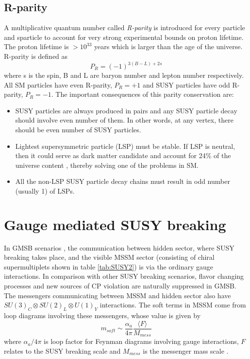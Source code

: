 \subsection{R-parity}
A multiplicative quantum number called \textit{R-parity} is introduced for every particle and sparticle to account for very strong experimental bounds on proton lifetime. The proton lifetime is $>10^{33}$ years \cite{PhysRevLett.102.141801} which is larger than the age of the universe. R-parity is defined as
\begin{equation}
\label{eqn:rparity}
P_R = (-1)^{3(B-L)+2s}
\end{equation}
where s is the spin, B and L are baryon number and lepton number respectively. All SM particles have even R-parity, $P_R=+1$ and SUSY particles have odd R-parity, $P_R=-1$. The important consequences of this parity conservation are:
\begin{itemize}
\item SUSY particles are always produced in pairs and any SUSY particle decay should involve even number of them. In other words, at any vertex, there should be even number of SUSY particles.
\item Lightest supersymmetric particle (LSP) must be stable. If LSP is neutral, then it could serve as dark matter candidate and account for 24\% of the universe content \cite{ELLIS1984453}, thereby solving one of the problems in SM.
\item All the non-LSP SUSY particle decay chains must result in odd number (usually 1) of LSPs.
\end{itemize}

\section{Gauge mediated SUSY breaking}
\label{sec:gmsb}
In GMSB scenarios \cite{Dine:1993yw,Dine:1994vc,Dine:1995ag,Meade:2008wd,Giudice:1998bp,Grajek:2013ola}, the communication between hidden sector, where SUSY breaking takes place, and the visible MSSM sector (consisting of chiral supermultiplets shown in table \ref{tab:SUSY2}) is via the ordinary gauge interactions. In comparison with other SUSY breaking scenarios, flavor changing processes and new sources of CP violation are naturally suppressed \cite{Dine:1993yw} in GMSB. The messengers communicating between MSSM and hidden sector also have $SU(3)_C \otimes SU(2)_L \otimes U(1)_Y$ interactions. The soft terms in MSSM come from loop diagrams involving these messengers, whose value is given by
\begin{equation}
m_{soft} \sim \frac{\alpha_{a}}{4\pi} \frac{\langle F \rangle}{M_{mess}}
\end{equation}
where $\alpha_{a}/{4\pi}$ is loop factor for Feynman diagrams involving gauge interactions, $F$ relates to the SUSY breaking scale and $M_{mess}$ is the messenger mass scale \cite{Martin:1997ns}.

